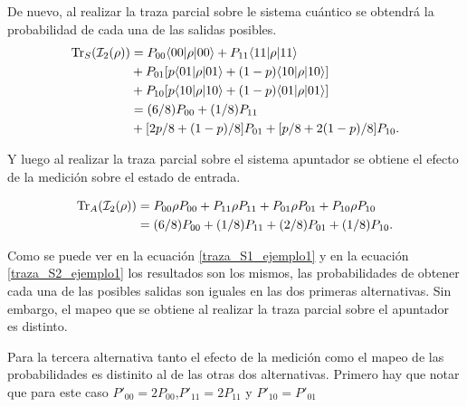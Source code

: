 De nuevo, al realizar la traza parcial sobre le sistema cuántico se obtendrá la probabilidad de cada una de las salidas posibles.
\begin{equation}\label{traza_S2_ejemplo1}
    \begin{split}
        {\rm Tr}_S(\mathcal{I}_2(\rho)) &= P_{00} \langle 00|\rho|00\rangle + P_{11} \langle 11|\rho|11\rangle\\
        &+P_{01}[p \langle 01|\rho|01\rangle+(1-p)\langle 10|\rho|10\rangle]\\
        &+P_{10}[p \langle 10|\rho|10\rangle+(1-p)\langle 01|\rho|01\rangle]\\
        &=(6/8)P_{00} + (1/8)P_{11}\\
        &+[2p/8 +(1-p)/8]P_{01}+ [p/8+2(1-p)/8]P_{10}.\\
    \end{split}
\end{equation}

Y luego al realizar la traza parcial sobre el sistema apuntador se obtiene el efecto de la medición sobre el estado de entrada.

\begin{equation}\label{traza_A2_ejemplo1}
    \begin{split}
        {\rm Tr}_A(\mathcal{I}_2(\rho)) &= P_{00} \rho P_{00} + P_{11}\rho P_{11}+ P_{01}\rho P_{01}+ P_{10}\rho P_{10}\\
        &=(6/8)P_{00} + (1/8)P_{11}+(2/8)P_{01} + (1/8)P_{10}.\\
    \end{split}
\end{equation}

Como se puede ver en la ecuación {\ref{traza_S1_ejemplo1}} y en la ecuación {\ref{traza_S2_ejemplo1}} los resultados son los mismos, las probabilidades de obtener cada una de las posibles salidas son iguales en las dos primeras alternativas. Sin embargo, el mapeo que se obtiene al realizar la traza parcial sobre el apuntador es distinto. 


Para la tercera alternativa tanto el efecto de la medición como el mapeo de las probabilidades es distinito al de las otras dos alternativas. Primero hay que notar que para este caso $P'_{00}=2P_{00}$,$P'_{11}= 2P_{11}$ y $P'_{10}=P'_{01}$


